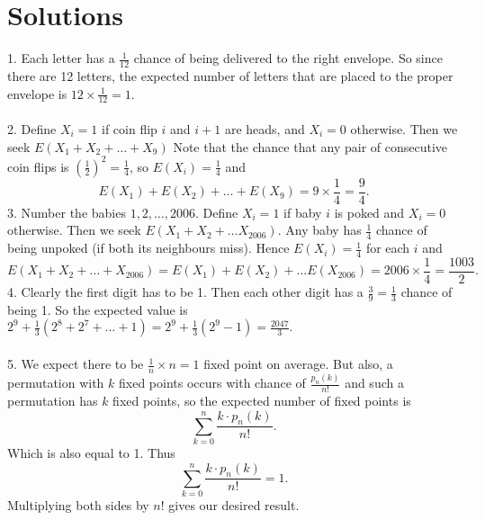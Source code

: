\documentclass{article}
\begin{document}
\section{Solutions}
1. Each letter has a $\frac{1}{12}$ chance of being delivered to the right envelope. So since there are 12 letters, the expected number of letters that are placed to the proper envelope is $12 \times \frac{1}{12}=1$. \\\\
2. Define $X_i = 1$ if coin flip $i$ and $i+1$ are heads, and $X_i=0$ otherwise.  Then we seek $E(X_1 + X_2 +\ldots + X_9)$ Note that the chance that any pair of consecutive coin flips is $(\frac{1}{2})^2=\frac{1}{4}$, so $E(X_i)=\frac{1}{4}$ and $$E(X_1)+E(X_2)+\ldots+E(X_9)=9 \times \frac{1}{4}=\frac{9}{4}.$$
3. Number the babies $1,2, \ldots, 2006$. Define $X_i = 1$ if baby $i$ is poked and $X_i=0$ otherwise. Then we seek $E(X_1 + X_2 + \ldots X_{2006})$. Any baby has $\frac{1}{4}$ chance of being unpoked (if both its neighbours miss). Hence $E(X_i)=\frac{1}{4}$ for each $i$ and $$E(X_1 + X_2 + \ldots + X_{2006}) = E(X_1) + E(X_2) + \ldots E(X_{2006}) = 2006 \times \frac{1}{4} = \frac{1003}{2}. $$
4. Clearly the first digit has to be 1. Then each other digit has a $\frac{3}{9}=\frac{1}{3}$ chance of being 1. So the expected value is $2^9 + \frac{1}{3}(2^8+2^7+\ldots+1) = 2^9+\frac{1}{3}(2^9-1)=\frac{2047}{3}.$ \\\\
5. We expect there to be $\frac{1}{n} \times n = 1$ fixed point on average. But also, a permutation with $k$ fixed points occurs with chance of $\frac{p_n (k)}{n!}$ and such a permutation has $k$ fixed points, so the expected number of fixed points is $$\sum_{k=0}^{n} \frac{k \cdot p_n (k)}{n!}.$$ Which is also equal to 1. Thus $$\sum_{k=0}^{n} \frac{k \cdot p_n (k)}{n!}=1.$$ Multiplying both sides by $n!$ gives our desired result. 


\\\\
\end{document}
